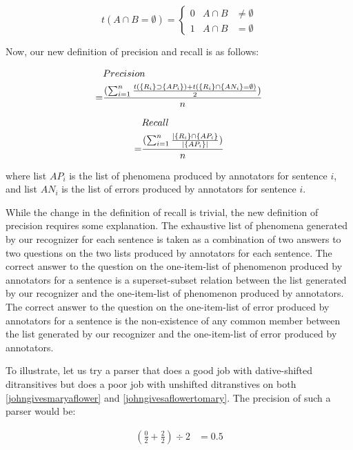\documentclass[11pt]{article}
\begin{document}
\[
t(A \cap B=\emptyset) = \left\{ 
\begin{array}{ccc}
0 & A \cap B & \neq \emptyset \\
1 & A \cap B & =\emptyset 
\end{array} \right.
\]

Now, our new definition of precision and recall is as follows:

\begin{align}
        &  Precision  \\
       =& \frac{(\sum_{i=1}^n \frac{t(\{R_{i}\}\supset\{AP_{i}\})+t(\{R_{i}\}\cap\{AN_{i}\}=\emptyset)}{2})}{n} \notag
\end{align}\label{redefinedprecision}

\begin{align}
        & Recall \\
       =& \frac{(\sum_{i=1}^n \frac{\mid\{R_{i}\}\cap\{AP_{i}\}}{\mid\{AP_{i}\}\mid})}{n} \notag
\end{align}


\noindent where list $AP_{i}$ is the list of phenomena produced by annotators for sentence $i$, and list $AN_{i}$ is the list of errors produced by annotators for sentence $i$.

While the change in the definition of recall is trivial, the new definition of precision requires some explanation. The exhaustive list of phenomena generated by our recognizer for each sentence is taken as a combination of two answers to two questions on the two lists produced by annotators for each sentence. The correct answer to the question on the one-item-list of phenomenon produced by annotators for a sentence is a superset-subset relation between the list generated by our recognizer and the one-item-list of phenomenon produced by annotators. The correct answer to the question on the one-item-list of error produced by annotators for a sentence is the non-existence of any common member between the list generated by our recognizer and the one-item-list of error produced by annotators.

To illustrate, let us try a parser that does a good job with dative-shifted ditransitives but does a poor job with unshifted ditranstives on both  \ref{johngivesmaryaflower} and \ref{johngivesaflowertomary}. The precision of such a parser would be:

 \begin{align*}
            (\frac{0}{2} + \frac{2}{2})\div 2 &= 0.5
\end{align*}
\end{document}
